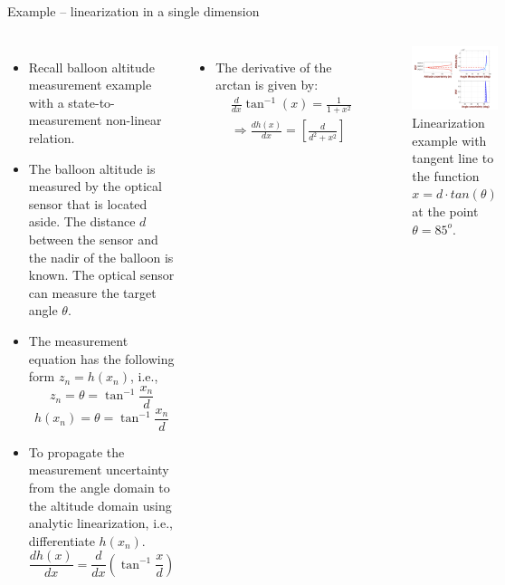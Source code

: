 \begin{frame}{Example – linearization in a single dimension}
\begin{columns}
\begin{itemize}
    \item Recall balloon altitude measurement example with a state-to-measurement non-linear relation.
    \item The balloon altitude is measured by the optical sensor that is located aside. The distance $d$ between the sensor and the nadir of the balloon is known. The optical sensor can measure the target angle $\theta$.
    \item The measurement equation has the following form $z_n = h(x_n)$, i.e., 
    \[
z_n = \theta = \tan^{-1} \frac{x_n}{d}
\]
\[
h(x_n) = \theta = \tan^{-1} \frac{x_n}{d}
\]

    \item To propagate the measurement uncertainty from the angle domain to the altitude domain using analytic linearization, i.e., differentiate $h(x_n)$.
    \[
\frac{dh(x)}{dx} = \frac{d}{dx} \left( \tan^{-1} \frac{x}{d} \right)
\]
\end{itemize}

\begin{itemize}
    \item The derivative of the arctan is given by:
\begin{align*}
    & \frac{d}{dx} \tan^{-1}(x)  = \frac{1}{1 + x^2} \\
& \Rightarrow 
\frac{dh(x)}{dx} = \left[ \frac{d}{d^2 + x^2} \right]
\end{align*}
\end{itemize} 
\begin{figure}
    \centering
    \includegraphics[width=0.95\linewidth]{Figures//Part3/Balloon_Linearization.png}
    \vspace{-10pt}
    \caption{Linearization example with tangent line to the function $x = d \cdot tan(\theta)$ at the point $\theta=85^o$.}
    \label{fig:enter-label}
\end{figure}
\end{columns}


\end{frame}
